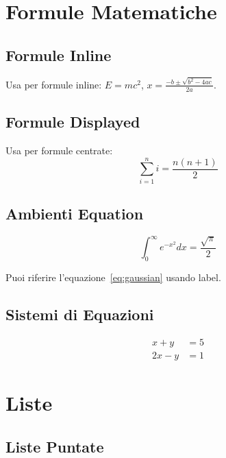 \documentclass{csnotes}
\begin{document}
\section{Formule Matematiche}

\subsection{Formule Inline}

Usa  per formule inline: 
\(E = mc^2\), \(x = \frac{-b \pm \sqrt{b^2 - 4ac}}{2a}\).

\subsection{Formule Displayed}

Usa \code{\textbackslash[...\textbackslash]} per formule centrate:
\[
\sum_{i=1}^{n} i = \frac{n(n+1)}{2}
\]

\subsection{Ambienti Equation}

\begin{equation}
    \int_0^\infty e^{-x^2} dx = \frac{\sqrt{\pi}}{2}
    \label{eq:gaussian}
\end{equation}

Puoi riferire l'equazione~\eqref{eq:gaussian} usando label.

\subsection{Sistemi di Equazioni}

\begin{align}
    x + y &= 5 \\
    2x - y &= 1
\end{align}


\section{Liste}

\subsection{Liste Puntate}
\end{document}
